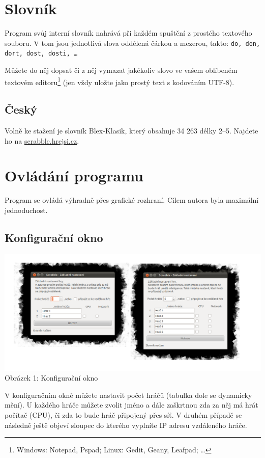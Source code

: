\documentclass[a4paper]{article}
\begin{document}
\section{Slovník}
Program svůj interní slovník nahrává při každém spuštění z prostého textového souboru. V tom jsou jednotlivá slova oddělená čárkou a mezerou, takto:
\texttt{do, don, dort, dost, dosti, \ldots{}} 

Můžete do něj dopsat či z něj vymazat jakékoliv slovo ve vašem oblíbeném textovém editoru\footnote{Windows: Notepad, Pspad; Linux: Gedit, Geany, Leafpad; \ldots{}} (jen vždy uložte jako prostý text s kodováním UTF-8). 

\subsection{Český}
Volně ke stažení je slovník Blex-Klasik, který obsahuje 34 263 délky 2--5. Najdete ho na \href{http://scrabble.hrejsi.cz/pravidla/blex.htm}{scrabble.hrejsi.cz}.

\section{Ovládání programu}
Program se ovládá výhradně přes grafické rozhraní. Cílem autora byla maximální jednoduchost.

\subsection{Konfigurační okno}
\begin{center}
\includegraphics[scale=1.2]{pic/configWin.png}
Obrázek 1: Konfigurační okno
\end{center}
V konfiguračním okně můžete nastavit počet hráčů (tabulka dole se dynamicky mění). U každého hráče můžete zvolit jméno a dále zaškrtnou zda za něj má hrát počítač (CPU), či zda to bude hráč připojený přes síť. V druhém případě se následně ještě objeví sloupec do kterého vyplníte IP adresu vzdáleného hráče. 
\end{document}
